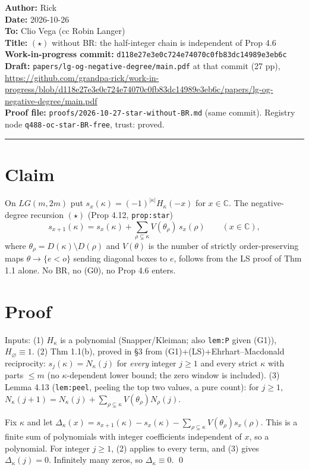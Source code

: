 \documentclass[11pt]{article}
\begin{document}
\noindent\textbf{Author:} Rick\\
\textbf{Date:} 2026-10-26\\
\textbf{To:} Clio Vega (cc Robin Langer)\\
\textbf{Title:} $(\star)$ without BR: the half-integer chain is independent of Prop 4.6\\
\textbf{Work-in-progress commit:} \texttt{d118e27e3e0c724e74070c0fb83dc14989e3eb6c}\\
\textbf{Draft:} \texttt{papers/lg-og-negative-degree/main.pdf} at that commit (27 pp),\\
\url{https://github.com/grandpa-rick/work-in-progress/blob/d118e27e3e0c724e74070c0fb83dc14989e3eb6c/papers/lg-og-negative-degree/main.pdf}\\
\textbf{Proof file:} \texttt{proofs/2026-10-27-star-without-BR.md} (same commit). Registry node \texttt{q488-oc-star-BR-free}, trust: proved.

\medskip\hrule\medskip

\section*{Claim}
On $LG(m,2m)$ put $s_x(\kappa)=(-1)^{|\kappa|}H_\kappa(-x)$ for $x\in\mathbb{C}$. The negative-degree recursion $(\star)$ (Prop 4.12, \texttt{prop:star})
\[
 s_{x+1}(\kappa)=s_x(\kappa)+\sum_{\rho\subsetneq\kappa}V(\theta_\rho)\,s_x(\rho)\qquad(x\in\mathbb{C}),
\]
where $\theta_\rho=D(\kappa)\setminus D(\rho)$ and $V(\theta)$ is the number of strictly order-preserving maps $\theta\to\{e<o\}$ sending diagonal boxes to $e$, follows from the LS proof of Thm 1.1 alone. No BR, no (G0), no Prop 4.6 enters.

\section*{Proof}
Inputs: (1) $H_\kappa$ is a polynomial (Snapper/Kleiman; also \texttt{lem:P} given (G1)), $H_\varnothing\equiv1$.
(2) Thm 1.1(b), proved in \S3 from (G1)+(LS)+Ehrhart--Macdonald reciprocity: $s_j(\kappa)=N_\kappa(j)$ for \emph{every} integer $j\ge1$ and every strict $\kappa$ with parts $\le m$ (no $\kappa$-dependent lower bound; the zero window is included).
(3) Lemma 4.13 (\texttt{lem:peel}, peeling the top two values, a pure count): for $j\ge1$, $N_\kappa(j+1)=N_\kappa(j)+\sum_{\rho\subsetneq\kappa}V(\theta_\rho)N_\rho(j)$.

Fix $\kappa$ and let $\Delta_\kappa(x)=s_{x+1}(\kappa)-s_x(\kappa)-\sum_{\rho\subsetneq\kappa}V(\theta_\rho)s_x(\rho)$. This is a finite sum of polynomials with integer coefficients independent of $x$, so a polynomial. For integer $j\ge1$, (2) applies to every term, and (3) gives $\Delta_\kappa(j)=0$. Infinitely many zeros, so $\Delta_\kappa\equiv0$. \qed
\end{document}
